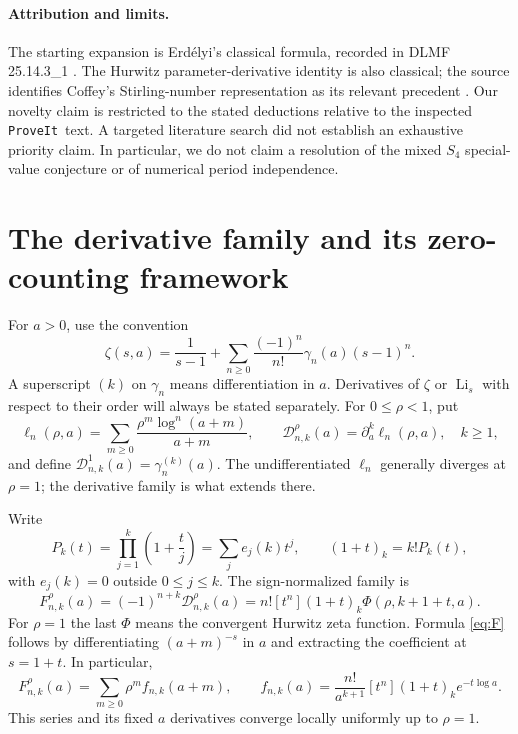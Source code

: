 \documentclass[11pt]{article}
\numberwithin{equation}{section}
\theoremstyle{definition}\newtheorem{definition}[theorem]{Definition}
\theoremstyle{remark}\newtheorem{remark}[theorem]{Remark}
\DeclareMathOperator{\Li}{Li}
\newcommand{\Dcal}{\mathcal D}
\newcommand{\repo}{\texttt{ProveIt}}
\begin{document}
\paragraph{Attribution and limits.}
The starting expansion is Erd\'elyi's classical formula, recorded in DLMF 25.14.3\_1 \cite{dlmflerch}. The Hurwitz parameter-derivative identity is also classical; the source identifies Coffey's Stirling-number representation as its relevant precedent \cite{coffey,repozeros}. Our novelty claim is restricted to the stated deductions relative to the inspected \repo\ text. A targeted literature search did not establish an exhaustive priority claim. In particular, we do not claim a resolution of the mixed $S_4$ special-value conjecture or of numerical period independence.

\section{The derivative family and its zero-counting framework}\label{sec:family}
For $a>0$, use the convention
\begin{equation}\label{eq:laurent}
\zeta(s,a)=\frac1{s-1}+\sum_{n\geq0}\frac{(-1)^n}{n!}\gamma_n(a)(s-1)^n.
\end{equation}
A superscript $(k)$ on $\gamma_n$ means differentiation in $a$. Derivatives of $\zeta$ or $\Li_s$ with respect to their order will always be stated separately.
For $0\leq\rho<1$, put
\[
\ell_n(\rho,a)=\sum_{m\geq0}\frac{\rho^m\log^n(a+m)}{a+m},
\qquad
\Dcal_{n,k}^{\rho}(a)=\partial_a^k\ell_n(\rho,a),\quad k\geq1,
\]
and define $\Dcal_{n,k}^{1}(a)=\gamma_n^{(k)}(a)$.
The undifferentiated $\ell_n$ generally diverges at $\rho=1$; the derivative family is what extends there.

Write
\begin{equation}\label{eq:P}
P_k(t)=\prod_{j=1}^k\left(1+\frac tj\right)=\sum_j e_j(k)t^j,
\qquad (1+t)_k=k!P_k(t),
\end{equation}
with $e_j(k)=0$ outside $0\leq j\leq k$. The sign-normalized family is
\begin{equation}\label{eq:F}
F_{n,k}^{\rho}(a)=(-1)^{n+k}\Dcal_{n,k}^{\rho}(a)
=n![t^n](1+t)_k\Phi(\rho,k+1+t,a).
\end{equation}
For $\rho=1$ the last $\Phi$ means the convergent Hurwitz zeta function. Formula \eqref{eq:F} follows by differentiating $(a+m)^{-s}$ in $a$ and extracting the coefficient at $s=1+t$. In particular,
\begin{equation}\label{eq:shiftseries}
F_{n,k}^{\rho}(a)=\sum_{m\geq0}\rho^m f_{n,k}(a+m),\qquad
f_{n,k}(a)=\frac{n!}{a^{k+1}}[t^n](1+t)_k e^{-t\log a}.
\end{equation}
This series and its fixed $a$ derivatives converge locally uniformly up to $\rho=1$.
\end{document}
